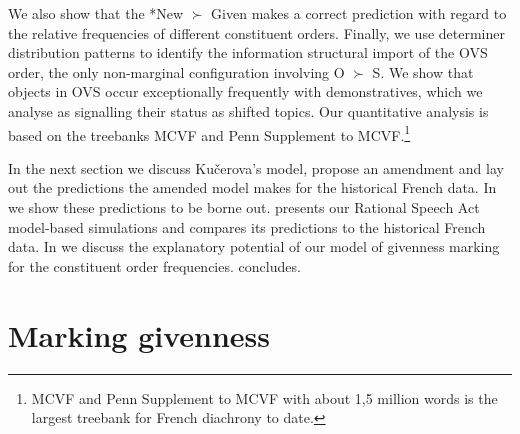 \documentclass[output=paper,modfonts,nonflat]{langsci/langscibook}
\begin{document}
We also show that the *New $\succ$ Given makes a correct prediction with regard to the relative frequencies of different constituent orders. Finally, we use determiner distribution patterns to identify the information structural import of the OVS order, the only non-marginal configuration involving O $\succ$ S. We show that objects in OVS occur exceptionally frequently with demonstratives, which we analyse as signalling their status as shifted topics. Our quantitative analysis is based on the treebanks MCVF and Penn Supplement to MCVF.\footnote{MCVF and Penn Supplement to MCVF with about 1,5 million words is the largest treebank for French diachrony to date.}

In the next section we discuss Ku\v{c}erova's model, propose an amendment and lay out the predictions the amended model makes for the historical French data. In  we show these predictions to be borne out.  presents our Rational Speech Act model-based simulations and compares its predictions to the historical French data. In  we discuss the explanatory potential of our model of givenness marking for the constituent order frequencies.  concludes.

\nocite{MCVF}



\section{Marking givenness}
\end{document}
